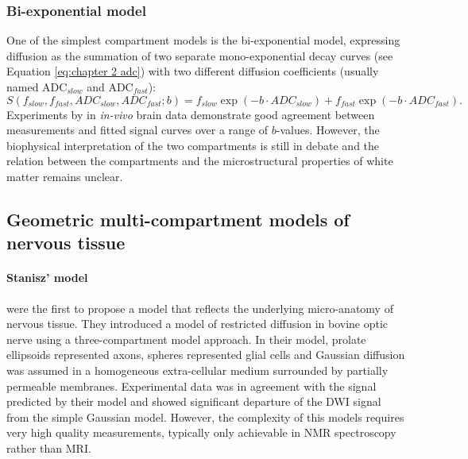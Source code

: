 \subsubsection{Bi-exponential model}
One of the simplest compartment models is the bi-exponential model, expressing diffusion as the summation of two separate mono-exponential decay curves (see Equation \ref{eq:chapter 2 adc}) with two different diffusion coefficients (usually named \gls{ADC}$_{slow}$ and \gls{ADC}$_{fast}$):
\begin{equation}
	S(f_{slow},f_{fast},ADC_{slow},ADC_{fast}; b) = f_{slow} \exp(-b\cdot ADC_{slow}) + f_{fast} \exp(-b\cdot ADC_{fast}).
\end{equation}
Experiments by \citet{Clark:2002} in \emph{in-vivo} brain data demonstrate good agreement between measurements and fitted signal curves over a range of $b$-values. However, the biophysical interpretation of the two compartments is still in debate and the relation between the compartments and the microstructural properties of white matter remains unclear. 
\subsection{Geometric multi-compartment models of nervous tissue}
\paragraph*{Stanisz' model}
\citet{Stanisz:1997} were the first to propose a model that reflects the underlying micro-anatomy of nervous tissue. They introduced a model of restricted diffusion in bovine optic nerve using a three-compartment model approach. In their model, prolate ellipsoids represented axons, spheres represented glial cells and Gaussian diffusion was assumed in a homogeneous extra-cellular medium surrounded by partially permeable membranes. Experimental data was in agreement with the signal predicted by their model and showed significant departure of the {\gls{DWI}} signal from the simple Gaussian model. However, the complexity of this models requires very high quality measurements, typically only achievable in \gls{NMR} spectroscopy rather than MRI.
